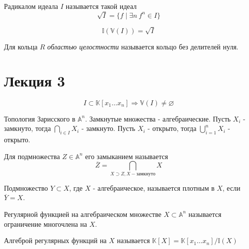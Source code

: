 \documentclass{article}
\begin{document}
\begin{definition}
    Радикалом идеала $I$ называется такой идеал
    $$\sqrt{I} = \{f \mid \exists n \ f^n \in I\}$$
\end{definition}

\begin{theorem}
    $$\mathbb{I}(\mathbb{V}(I)) = \sqrt{I}$$
\end{theorem}

\begin{definition}
    Для кольца $R$ \textit{областью целостности}
    называется кольцо без делителей нуля.
\end{definition}

\section*{Лекция 3}

\begin{theorem}
    $$I \subset \mathbb{K}[x_1 \dots x_n] \Rightarrow \mathbb{V}(I) \neq \varnothing$$
\end{theorem}

\begin{definition}
    Топология Зарисского в $\mathbb{A}^n$.
    Замкнутые множества - алгебраические.
    Пусть $X_i$ - замкнуто, тогда
    $\bigcap\limits_{i \in I} X_i$ - замкнуто.
    Пусть $X_i$ - открыто, тогда
    $\bigcup\limits_{i = 1}^{n} X_i$ - открыто.
\end{definition}

\begin{definition}
    Для подмножества $Z \in \mathbb{A}^n$ его замыканием
    называется
    $$\overline{Z} = \bigcap\limits_{X \supset Z, X - \text{замкнуто}} X$$
\end{definition}

\begin{definition}
    Подмножество $Y \subset X$, где $X$ - алгебраическое,
    называется плотным в $X$, если $\overline{Y} = X$.
\end{definition}

\begin{definition}
    Регулярной функцией на алгебраическом множестве
    $X \subset \mathbb{A}^n$ называется ограничение
    многочлена на $X$.
\end{definition}

\begin{definition}
    Алгеброй регулярных функций на $X$ называется
    $\mathbb{K}[X] = \mathbb{K}[x_1 \dots x_n] / \mathbb{I}(X)$
\end{definition}
\end{document}
